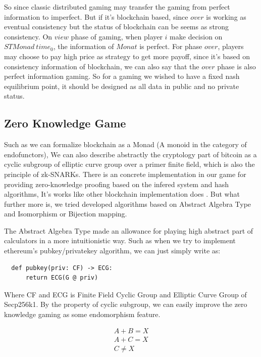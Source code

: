 \documentclass[twocolumn]{article}
\begin{document}
So since classic distributed gaming may transfer the gaming from perfect information to imperfect. But if it's blockchain based, since $over$ is working as eventual consistency\cite{consis} but the status of blockchain can be seems as strong consistency\cite {Consistent}. On $view$ phase of gaming, when player $i$ make decision on $STMonad \  time_0$, the information of $Monat$ is perfect. For phase $over$, players may choose to pay high price as strategy to get more payoff, since it's based on consistency information of blockchain, we can also say that the $over$ phase is also perfect information gaming. So for a gaming we wished to have a fixed nash equilibrium point, it should be designed as all data in public and no private status.

\subsection {Zero Knowledge Game}

Such as we can formalize blockchain as a Monad (A monoid in the category of endofunctors), We can also describe abstractly the cryptology part of bitcoin as a cyclic subgroup of elliptic curve group over a primer finite field, which is also the principle of zk-SNARKs. There is an concrete implementation in our game for providing zero-knowledge proofing based on the infered system and hash algorithms, It's works like other blockchain implementation does \cite{zcash}. But what further more is, we tried developed algorithms based on Abstract Algebra Type and Isomorphism or Bijection mapping.

The Abstract Algebra Type made an allowance for playing high abstract part of calculators in a more intuitionistic way. Such as when we try to implement ethereum's pubkey/privatekey algorithm, we can just simply write as\cite{klefki}:

\lstset{language=Python}
\begin{lstlisting}
  def pubkey(priv: CF) -> ECG:
      return ECG(G @ priv)
\end{lstlisting}

Where CF and ECG is Finite Field Cyclic Group and Elliptic Curve Group of Secp256k1. By the property of cyclic subgroup, we can easily improve the zero knowledge gaming as some endomorphism feature.

\begin{gather}
  A + B = X \\
  A + C = X \\
  C \neq X
\end{gather}
\end{document}
